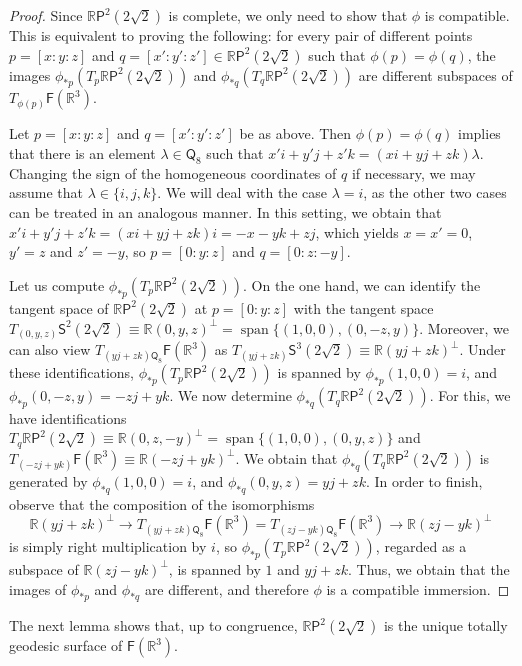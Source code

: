 \documentclass[11pt,a4paper,final]{amsart}
\newcommand{\s}{\mathsf}
\newcommand{\R}{\mathbb{R}}
\newcommand{\spann}{\operatorname{span}}
\theoremstyle{definition}
\begin{document}
\begin{proof}
	Since $\R\s{P}^{2}(2\sqrt{2})$ is complete, we only need to show that $\phi$ is compatible.
	This is equivalent to proving the following: for every pair of different points $p=[x:y:z]$ and $q=[x':y':z']\in\R\s{P}^{2}(2\sqrt{2})$ such that $\phi(p)=\phi(q)$, the images $\phi_{*p}(T_{p}\R\s{P}^{2}(2\sqrt{2}))$ and $\phi_{*q}(T_{q}\R\s{P}^{2}(2\sqrt{2}))$ are different subspaces of $T_{\phi(p)}\s{F}(\R^{3})$.
		
	Let $p=[x:y:z]$ and $q=[x':y':z']$ be as above.
	Then $\phi(p)=\phi(q)$ implies that there is an element $\lambda\in\s{Q}_{8}$ such that $x'i+y'j+z'k=(xi+yj+zk)\lambda$.
	Changing the sign of the homogeneous coordinates of $q$ if necessary, we may assume that $\lambda\in \{i,j,k\}$.
	We will deal with the case $\lambda=i$, as the other two cases can be treated in an analogous manner.
	In this setting, we obtain that $x'i+y'j+z'k=(xi+yj+zk)i=-x-yk+zj$, which yields $x=x'=0$, $y'=z$ and $z'=-y$, so $p=[0:y:z]$ and $q=[0:z:-y]$. 
	
	Let us compute $\phi_{*p}(T_{p}\R\s{P}^{2}(2\sqrt{2}))$.
	On the one hand, we can identify the tangent space of $\R\s{P}^{2}(2\sqrt{2})$ at $p=[0:y:z]$ with the tangent space $T_{(0,y,z)}\s{S}^{2}(2\sqrt{2})\equiv \R (0,y,z)^{\perp}=\spann\{(1,0,0),(0,-z,y)\}$.
	Moreover, we can also view $T_{(yj+zk)\s{Q}_{8}}\s{F}(\R^{3})$ as $T_{(yj+zk)}\s{S}^{3}(2\sqrt{2})\equiv\R(yj+zk)^{\perp}$.
	Under these identifications, $\phi_{*p}(T_{p}\R\s{P}^{2}(2\sqrt{2}))$ is spanned by $\phi_{*p}(1,0,0)=i$, and  $\phi_{*p}(0,-z,y)=-zj+yk$.		
	We now determine $\phi_{*q}(T_{q}\R\s{P}^{2}(2\sqrt{2}))$.
	For this, we have identifications $T_{q}\R \s{P}^{2}(2\sqrt{2})\equiv \R(0,z,-y)^{\perp}=\spann \{(1,0,0),(0,y,z)\}$ and $T_{(-zj+yk)}\s{F}(\R^{3})\equiv \R(-zj+yk)^{\perp}$.
	We obtain that $\phi_{*q}(T_{q}\R\s{P}^{2}(2\sqrt{2}))$ is generated by $
	\phi_{*q}(1,0,0)=i$, and $\phi_{*q}(0,y,z)=yj+zk$.
	In order to finish, observe that the composition of the isomorphisms \[\R(yj+zk)^{\perp}\to T_{(yj+zk)\s{Q}_{8}}\s{F}(\R^{3})=T_{(zj-yk)\s{Q}_{8}}\s{F}(\R^{3})\to \R(zj-yk)^{\perp}\]
	is simply right multiplication by $i$, so $\phi_{*p}(T_{p}\R\s{P}^{2}(2\sqrt{2}))$, regarded as a subspace of $\R (zj-yk)^{\perp}$, is spanned by $1$ and $yj+zk$.
	Thus, we obtain that the images of $\phi_{*p}$ and $\phi_{*q}$ are different, and therefore $\phi$ is a compatible immersion. \qedhere
\end{proof}
	
The next lemma shows that, up to congruence, $\R \s{P}^{2}(2\sqrt{2})$ is the unique totally geodesic surface of $\s{F}(\R^{3})$.
	
\end{document}
